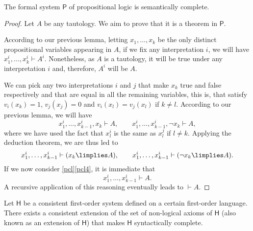 \begin{theorem}
The formal system $\mathsf{P}$ of propositional logic is semantically complete.
\label{psemcom}
\end{theorem}

\begin{proof}
Let $A$ be any tautology. We aim to prove that it is a theorem in $\mathsf{P}$.

According to our previous lemma, letting $x_1,\ldots,x_k$ be the only distinct propositional variables appearing in $A$, if we fix any interpretation $i$, we will have $x_1^i,\ldots,x_k^i \vdash A^i$. Nonetheless, as $A$ is a tautology, it will be true under any interpretation $i$ and, therefore, $A^i$ will be $A$.

We can pick any two interpretations $i$ and $j$ that make $x_k$ true and false respectively and that are equal in all the remaining variables, this is, that satisfy $v_i(x_k) = 1$, $v_j(x_j) = 0$ and $v_i(x_l) = v_j(x_l)$ if $k \neq l$.
According to our previous lemma, we will have
\[ x_1^i,\ldots,x_{k-1}^i,x_k \vdash A,\qquad
x_1^i,\ldots,x_{k-1}^i, \lnot x_k \vdash A,\]
where we have used the fact that $x_l^i$ is the same as $x_l^j$ if $l \neq k$.
Applying the deduction theorem, we are thus led to
\[ x_1^i,\ldots,x_{k-1}^i \vdash (x_k \limplies A),\qquad
x_1^i,\ldots,x_{k-1}^i \vdash (\lnot x_k \limplies A).\]
If we now consider \ref{pcl}\ref{pcl4}, it is immediate that
\[ x_1^i,\ldots,x_{k-1}^i \vdash A.\]
A recursive application of this reasoning eventually leads to $\vdash A$.
\end{proof}


\begin{lemma}
Let $\mathsf{H}$ be a consistent first-order system defined on a certain first-order language.
There exists a consistent extension of the set of non-logical axioms of $\mathsf{H}$ (also known as an extension of $\mathsf{H}$) that makes $\mathsf{H}$ syntactically complete.
\label{fol-scext}
\end{lemma}

